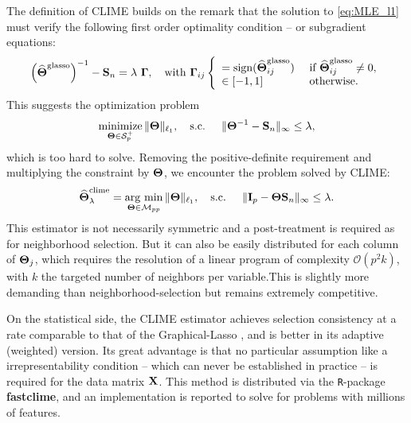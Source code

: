 The definition  of CLIME  builds on  the remark  that the  solution to
\eqref{eq:MLE_l1}  must verify  the following  first order  optimality
condition -- or subgradient equations:
\begin{equation*}
  \left(\widehat{\boldsymbol\Theta}^{\text{glasso}}\right)^{-1} - \mathbf{S}_n = \lambda
  \ \boldsymbol\Gamma, \quad \text{with }
  \boldsymbol\Gamma_{ij} \left\{\begin{array}{ll}
      =    \mathrm{sign}(\widehat{\boldsymbol\Theta}^{\text{glasso}}_{ij})    &   \text{    if    }
    \widehat{\boldsymbol\Theta}^{\text{glasso}}_{ij} \neq 0, \\
    \in [-1,1] & \text{ otherwise}.\\
  \end{array}\right.
\end{equation*}
This suggests the optimization problem
\begin{equation*}
  \mathop{\mathrm{minimize}}_{\boldsymbol\Theta \in \mathcal{S}_{p}^+} \|\boldsymbol\Theta\|_{\ell_1}, \quad \text{s.c.  }
  \quad \|\boldsymbol\Theta^{-1} - \mathbf{S}_n \|_\infty \leq \lambda,
\end{equation*}
which is too hard to solve. Removing the positive-definite requirement
and multiplying the constraint by  $\boldsymbol\Theta$, we encounter the problem
solved by CLIME:
\begin{equation}
  \label{eq:clime}
  \widehat{\boldsymbol\Theta}_{\lambda}^{\text{clime}} = \mathop{\mathrm{arg\ min}}_{\boldsymbol\Theta \in \mathcal{M}_{pp}} \|\boldsymbol\Theta\|_{\ell_1}, \quad \text{s.c.  }
  \quad \|\mathbf{I}_{p} - \boldsymbol\Theta\mathbf{S}_n \|_\infty \leq \lambda.
\end{equation}
This estimator  is not necessarily  symmetric and a  post-treatment is
required as  for neighborhood  selection.  But it  can also  be easily
distributed  for  each  column  of  $\boldsymbol\Theta_j$,  which  requires  the
resolution of a linear program of complexity $\mathcal{O}(p^2k)$, with
$k$ the  targeted number  of neighbors  per variable.This  is slightly
more  demanding  than  neighborhood-selection  but  remains  extremely
competitive.

On  the  statistical  side,  the CLIME  estimator  achieves  selection
consistency  at  a rate  comparable  to  that of  the  Graphical-Lasso
\cite{2011_AS_Cai}, and is better  in its adaptive (weighted) version.
Its  great  advantage   is  that  no  particular   assumption  like  a
irrepresentability  condition --  which  can never  be established  in
practice --  is required for  the data  matrix $\mathbf{X}$.  This  method is
distributed  via  the  \texttt{R}-package \textbf{fastclime},  and  an
implementation \cite{NIPS2013_5037} is reported  to solve for problems
with millions of features.

